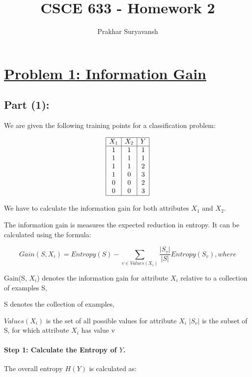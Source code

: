 \documentclass[12pt]{article}
\title{CSCE 633 - Homework 2}
\author{Prakhar Suryavansh}
\date{}
\begin{document}
\maketitle

\section*{\underline{Problem 1:  Information Gain}}

\subsection*{Part (1):}

We are given the following training points for a classification problem:

\[
  \begin{array}{|c|c|c|}
    \hline
    X_1 & X_2 & Y \\
    \hline
    1   & 1   & 1 \\
    1   & 1   & 1 \\
    1   & 1   & 2 \\
    1   & 0   & 3 \\
    0   & 0   & 2 \\
    0   & 0   & 3 \\
    \hline
  \end{array}
\]

We have to calculate the information gain for both attributes $X_1$ and $X_2$.

The information gain is measures the expected reduction in entropy. It can be calculated using the formula:

\[
  Gain(S, X_i) = Entropy(S) - \sum_{v \in Values(X_i)}^{} \frac{|S_v|}{|S|} Entropy(S_v) , where
\]

Gain(S, $X_i$) denotes the information gain for attribute $X_i$ relative to a collection of examples S,

S denotes the collection of examples,

$Values(X_i)$ is the set of all possible values for attribute $X_i$
$|S_v|$ is the subset of S, for which attribute $X_i$ has value v



\paragraph{Step 1: Calculate the Entropy of $Y$.}

The overall entropy $H(Y)$ is calculated as:
\end{document}
